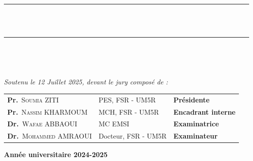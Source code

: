 \begin{titlepage}
\begin{center}
    \rule{\linewidth}{0.3mm} \\[0.4cm]
    { \huge \bfseries\color{blue} \mytitle \\[0.4cm] }
    \rule{\linewidth}{0.3mm} \\[1cm]
    
    \begin{center}
    \begin{minipage}{\linewidth}
    \begin{flushright}
   
    \end{flushright}   
    \end{minipage}\\[2cm]
    \end{center} 
    {\large \textit{Soutenu le 12 Juillet 2025, devant le jury composé de : }}\\[0.5cm]
    \color{black}
   
\begin{tabular}{>{\arraybackslash}m{6.5cm} >{\arraybackslash}m{5cm} >{\arraybackslash}m{5.5cm}}
        \large \textbf{Pr.}~\textsc{Soumia}   ZITI   & PES, FSR - UM5R & \large \textbf{Présidente} \\[0.1cm]
        \large \textbf{Pr.}~\textsc{Nassim}  KHARMOUM & MCH, FSR - UM5R      & \large \textbf{Encadrant interne} \\[0.1cm] 
        \large \textbf{Dr.}~\textsc{Wafae} ABBAOUI      & MC EMSI & \large \textbf{Examinatrice} \\[0.1cm]     
        \large \textbf{Dr.}~\textsc{Mohammed} AMRAOUI      & Docteur, FSR - UM5R & \large \textbf{Examinateur} \\[0.1cm]   
    \end{tabular}
    
    \vfill
    {\textbf{\large {Année universitaire} 2024-2025}}
    \end{center}
    \end{titlepage}